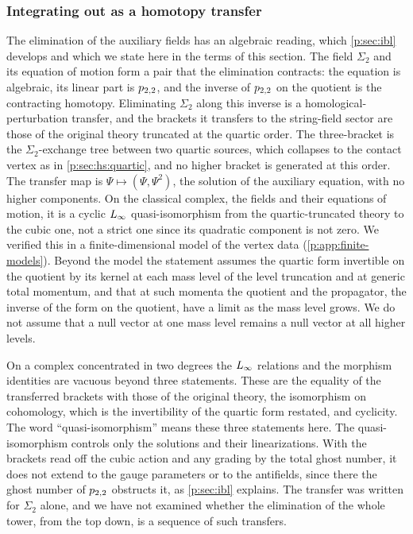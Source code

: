 \subsubsection{Integrating out as a homotopy transfer}
\label{p:sec:all:homotopy-transfer}

The elimination of the auxiliary fields has an algebraic reading, which \cref{p:sec:ibl} develops and which we state here in the terms of this section.
The field $\Sigma_2$ and its equation of motion form a pair that the elimination contracts: the equation is algebraic, its linear part is $p_{2,2}$, and the inverse of $p_{2,2}$ on the quotient is the contracting homotopy.
Eliminating $\Sigma_2$ along this inverse is a homological-perturbation transfer, and the brackets it transfers to the string-field sector are those of the original theory truncated at the quartic order.
The three-bracket is the $\Sigma_2$-exchange tree between two quartic sources, which collapses to the contact vertex as in \cref{p:sec:hs:quartic}, and no higher bracket is generated at this order.
The transfer map is $\Psi \mapsto (\Psi, \Psi^2)$, the solution of the auxiliary equation, with no higher components.
On the classical complex, the fields and their equations of motion, it is a cyclic $L_\infty$ quasi-isomorphism from the quartic-truncated theory to the cubic one, not a strict one since its quadratic component is not zero.
We verified this in a finite-dimensional model of the vertex data (\cref{p:app:finite-models}).
Beyond the model the statement assumes the quartic form invertible on the quotient by its kernel at each mass level of the level truncation and at generic total momentum, and that at such momenta the quotient and the propagator, the inverse of the form on the quotient, have a limit as the mass level grows.
We do not assume that a null vector at one mass level remains a null vector at all higher levels.

On a complex concentrated in two degrees the $L_\infty$ relations and the morphism identities are vacuous beyond three statements.
These are the equality of the transferred brackets with those of the original theory, the isomorphism on cohomology, which is the invertibility of the quartic form restated, and cyclicity.
  The word ``quasi-isomorphism'' means these three statements here.
  The quasi-isomorphism controls only the solutions and their linearizations.
With the brackets read off the cubic action and any grading by the total ghost number, it does not extend to the gauge parameters or to the antifields, since there the ghost number of $p_{2,2}$ obstructs it, as \cref{p:sec:ibl} explains.
The transfer was written for $\Sigma_2$ alone, and we have not examined whether the elimination of the whole tower, from the top down, is a sequence of such transfers.

